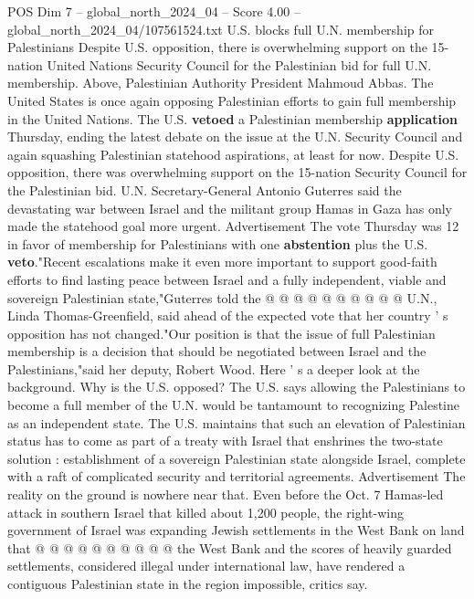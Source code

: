 \begin{textsample}{POS Dim 7 – global\_north\_2024\_04 – Score 4.00 – global\_north\_2024\_04/107561524.txt}  \label{ex:f7_pos_222}
U.S. blocks full U.N. membership for Palestinians Despite U.S. opposition, there is overwhelming support on the 15-nation United Nations Security Council for the Palestinian bid for full U.N. membership.
Above, Palestinian Authority President Mahmoud Abbas.
The United States is once again opposing Palestinian efforts to gain full membership in the United Nations.
The U.S. \textbf{vetoed} a Palestinian membership \textbf{application} Thursday, ending the latest debate on the issue at the U.N.
Security Council and again squashing Palestinian statehood aspirations, at least for now.
Despite U.S. opposition, there was overwhelming support on the 15-nation Security Council for the Palestinian bid.
U.N.
Secretary-General Antonio Guterres said the devastating war between Israel and the militant group Hamas in Gaza has only made the statehood goal more urgent.
Advertisement The vote Thursday was 12 in favor of membership for Palestinians with one \textbf{abstention} plus the U.S. \textbf{veto}."Recent escalations make it even more important to support good-faith efforts to find lasting peace between Israel and a fully independent, viable and sovereign Palestinian state,"Guterres told the @ @ @ @ @ @ @ @ @ @ U.N., Linda Thomas-Greenfield, said ahead of the expected vote that her country ' s opposition has not changed."Our position is that the issue of full Palestinian membership is a decision that should be negotiated between Israel and the Palestinians,"said her deputy, Robert Wood.
Here ' s a deeper look at the background.
Why is the U.S. opposed?
The U.S. says allowing the Palestinians to become a full member of the U.N. would be tantamount to recognizing Palestine as an independent state.
The U.S. maintains that such an elevation of Palestinian status has to come as part of a treaty with Israel that enshrines the two-state solution : establishment of a sovereign Palestinian state alongside Israel, complete with a raft of complicated security and territorial agreements.
Advertisement The reality on the ground is nowhere near that.
Even before the Oct. 7 Hamas-led attack in southern Israel that killed about 1,200 people, the right-wing government of Israel was expanding Jewish settlements in the West Bank on land that @ @ @ @ @ @ @ @ @ @ the West Bank and the scores of heavily guarded settlements, considered illegal under international law, have rendered a contiguous Palestinian state in the region impossible, critics say.

\end{textsample}
